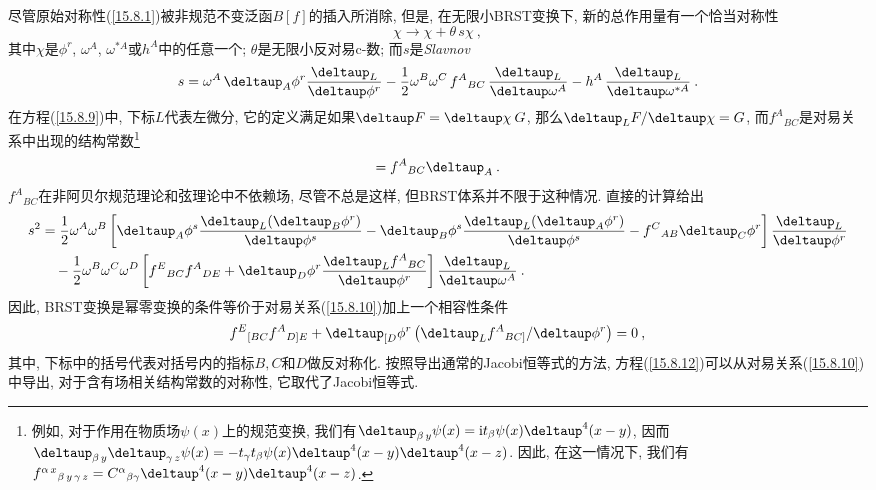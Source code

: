 尽管原始对称性(\ref{15.8.1})被非规范不变泛函$B[f]$的插入所消除, 但是, 在无限小BRST变换下, 新的总作用量有一个恰当对称性
\begin{equation}
\chi \rightarrow \chi +\theta \,s\chi \:,   \label{15.8.8}
\end{equation}%
其中$\chi $是$\phi ^{r}$, $\omega ^{A}$, $\omega ^{\ast A}$或$h^{A}$中的任意一个; $\theta $是无限小反对易c-数;
而$s$是\textit{Slavnov} {}%
\begin{equation}
s=\omega ^{A}\,\deltaup_{A}\phi ^{r}\frac{\deltaup _{L}}{\deltaup \phi ^{r}}-\frac{1%
}{2}\omega ^{B}\omega ^{C}\,f^{A}{}_{BC}\,\frac{\deltaup _{L}}{\deltaup \omega ^{A}}%
-h^{A}\,\frac{\deltaup _{L}}{\deltaup \omega ^{\ast A}}\:.   \label{15.8.9}
\end{equation}%
在方程(\ref{15.8.9})中, 下标$L$代表左微分, 它的定义满足如果$\deltaup F=\deltaup \chi \:G$, 那么$\deltaup_{L}F/\deltaup \chi =G$, 
而$f^{A}{}_{BC}$是对易关系中出现的结构常数\footnote{例如, 对于作用在物质场$\psi (x)$上的规范变换, 我们有$\deltaup_{\beta\, y}\psi (x)=\mi t_{\beta }\psi
(x)\deltaup ^{4}(x-y)$, 因而$\deltaup_{\beta\, y}\deltaup_{\gamma\, z}\psi (x)=-t_{\gamma }t_{\beta }\psi (x)\deltaup ^{4}(x-y)\deltaup^{4}(x-z)$.
因此, 在这一情况下, 我们有$f^{\alpha \,x}{}_{\beta \,y\,\gamma\, z}=C^{\alpha
}{}_{\beta \gamma }\deltaup^{4}(x-y)\deltaup^{4}(x-z)$.}%
\begin{equation}
[ \deltaup_{B},\deltaup_{C}]=f^{A}{}_{BC}\deltaup_{A}\:. \label{15.8.10}
\end{equation}%
$f^{A}{}_{BC}$在非阿贝尔规范理论和弦理论中不依赖场, 尽管不总是这样, 但BRST体系并不限于这种情况. 直接的计算给出%
\begin{align}
s^{2} &=\frac{1}{2}\omega ^{A}\omega ^{B}\left[ \deltaup_{A}\phi ^{s}\frac{%
\deltaup_{L}(\deltaup_{B}\phi ^{r})}{\deltaup \phi ^{s}}-\deltaup_{B}\phi ^{s}%
\frac{\deltaup _{L}(\deltaup _{A}\phi ^{r})}{\deltaup \phi ^{s}}%
-f^{C}{}_{AB}\deltaup _{C}\phi ^{r}\right] \frac{\deltaup _{L}}{\deltaup \phi ^{r}}
\nonumber \\
&\quad-\frac{1}{2}\omega ^{B}\omega ^{C}\omega ^{D}\left[
f^{E}{}_{BC}f^{A}{}_{DE}+\deltaup _{D}\phi ^{r}\frac{\deltaup _{L}f^{A}{}_{BC}}{%
\deltaup \phi ^{r}}\right] \frac{\deltaup _{L}}{\deltaup \omega ^{A}}\:.  \label{15.8.11}
\end{align}%
因此, BRST变换是幂零变换的条件等价于对易关系(\ref{15.8.10})加上一个相容性条件
\begin{equation}
f^{E}{}_{[BC}f^{A}{}_{D]E}+\deltaup_{[ D}\phi ^{r}\left( \deltaup_{L}f^{A}{}_{BC]}/\deltaup \phi ^{r}\right) =0\:,   \label{15.8.12}
\end{equation}%
其中, 下标中的括号代表对括号内的指标$B,C$和$D$做反对称化. 按照导出通常的Jacobi恒等式的方法, 
方程(\ref{15.8.12})可以从对易关系(\ref{15.8.10})中导出, 对于含有场相关结构常数的对称性, 它取代了Jacobi恒等式.

